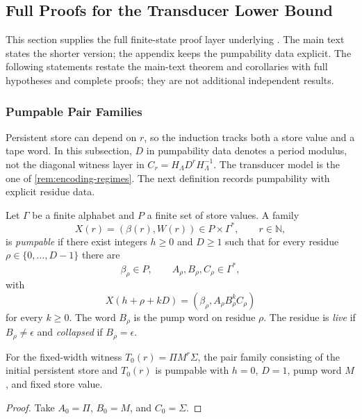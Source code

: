 \subsection{Full Proofs for the Transducer Lower Bound}
\label{app:sec:full-proofs}

This section supplies the full finite-state proof layer underlying
. The main text states
the shorter version; the appendix keeps the pumpability data explicit.
The following statements restate the main-text theorem and corollaries with
full hypotheses and complete proofs; they are not additional independent
results.

\subsubsection{Pumpable Pair Families}

Persistent store can depend on $r$, so the induction tracks both a store value
and a tape word. In this subsection, $D$ in pumpability data denotes a period
modulus, not the diagonal witness layer in $C_r=H_\Lambda D^rH_\Lambda^{-1}$.
The transducer model is the one of \cref{rem:encoding-regimes}.  The next
definition records pumpability with explicit residue data.

\begin{definition}
\label{app:def:pumpable}
Let $\Gamma$ be a finite alphabet and $P$ a finite set of store values. A family
\[
  X(r)=(\beta(r),W(r))\in P\times\Gamma^*,\qquad r\in\mathbb{N},
\]
is \emph{pumpable} if there exist integers $h\ge0$ and $D\ge1$ such that for
every residue $\rho\in\{0,\ldots,D-1\}$ there are
\[
  \beta_\rho\in P,
  \qquad
  A_\rho,B_\rho,C_\rho\in\Gamma^*,
\]
with
\[
  X(h+\rho+kD)=(\beta_\rho,A_\rho B_\rho^k C_\rho)
\]
for every $k\ge0$. The word $B_\rho$ is the pump word on residue $\rho$. The
residue is \emph{live} if $B_\rho\ne\epsilon$ and \emph{collapsed} if
$B_\rho=\epsilon$.
\end{definition}

\begin{lemma}
\label{app:lem:input-pumpable}
For the fixed-width witness $T_0(r)=\Pi M^r\Sigma$, the pair family consisting
of the initial persistent store and $T_0(r)$ is pumpable with $h=0$, $D=1$,
pump word $M$, and fixed store value.
\end{lemma}

\begin{proof}
Take $A_0=\Pi$, $B_0=M$, and $C_0=\Sigma$.
\end{proof}

